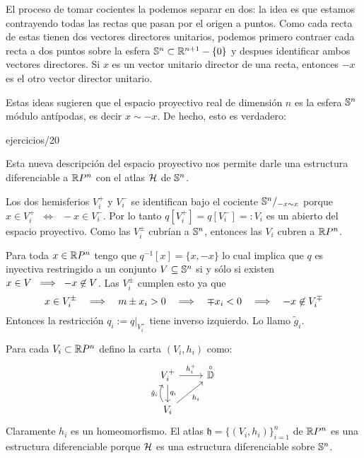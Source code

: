 \documentclass[../../topologia_algebraica]{subfiles}
\begin{document}
El proceso de tomar cocientes la podemos separar en dos: la idea es que estamos contrayendo
todas las rectas que pasan por el origen a puntos. Como cada recta de estas tienen dos
vectores directores unitarios, podemos primero contraer cada recta a dos puntos sobre la esfera
$\mathbb{S}^n\subset\mathbb{R}^{n+1}-\{0\}$ y despues identificar ambos vectores directores. Si $x$ es un vector
unitario director de una recta, entonces $-x$ es el otro vector director unitario.

Estas ideas sugieren que el espacio proyectivo real de dimensi\'on $n$ es la esfera $\mathbb{S}^n$ m\'odulo
ant\'ipodas, es decir $x\sim -x$. De hecho, esto es verdadero:

{ejercicios/20} %

Esta nueva descripci\'on del espacio proyectivo nos permite darle una estructura diferenciable a
$\mathbb{R} P^n$ con el atlas $\mathcal{H}$ de $\mathbb{S}^n$.

\begin{ejemplo}

Los dos hemisferios $V_i^+$ y $V_i^-$ se identifican bajo el cociente $\mathbb{S}^n/_{-x\sim x}$ porque
$x\in V_i^+\;\;\iff\;\; -x\in V_i^-$. Por lo tanto $q[V_i^+]=q[V_i^-]=:V_i$ es un abierto del
espacio proyectivo. Como las $V_i^{\pm}$ cubr\'ian a $\mathbb{S}^n$, entonces las $V_i$ cubren a $\mathbb{R} P^n$.

Para toda $x\in\mathbb{R} P^n$ tengo que $q^{-1}[x]=\{x,-x\}$ lo cual implica que $q$ es inyectiva
restringido a un conjunto $V\subseteq\mathbb{S}^n$ si y s\'olo si existen $x\in V \;\;\Longrightarrow\;\; -x\not\in V$.
Las $V_i^{\pm}$ cumplen esto ya que
\[
  x\in V_i^{\pm} \quad\Longrightarrow\quad
  m \pm x_i>0   \quad\Longrightarrow\quad
  \mp x_i<0    \quad\Longrightarrow\quad
  -x\not\in V_i^{\mp}
\]
Entonces la restricci\'on $q_i:=q|_{V_i^{+}}$ tiene inverso izquierdo. Lo llamo $\tilde{g}_i$.

Para cada $V_i\subset\mathbb{R} P^n$ defino la carta $(V_i,h_i)$ como:
\[
  \begin{tikzcd}
    V_i^+ \arrow[r,"h_i^+"] \arrow[d,"q_i"] & \overset{\circ}{\DD} \\
    V_i \arrow[u,bend left,"\tilde{g}_i"] \arrow[ur,"h_i"'] & 
  \end{tikzcd}
\]
Claramente $h_i$ es un homeomorfismo. El atlas $\mathfrak{h}=\{(V_i,h_i)\}_{i=1}^{n}$ de $\mathbb{R} P^n$
es una estructura diferenciable porque $\mathcal{H}$ es una estructura diferenciable sobre $\mathbb{S}^n$.

\end{ejemplo}
\end{document}

